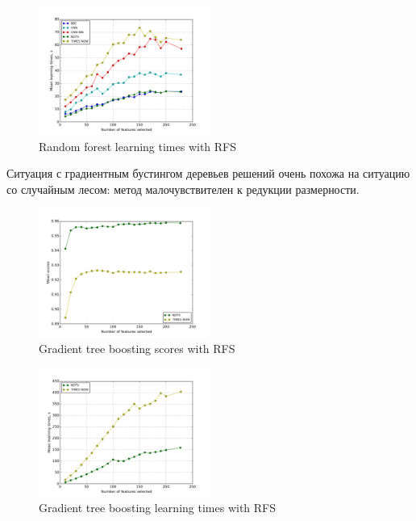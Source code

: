  \begin{figure}[h!]
    \centering
    \includegraphics[width=0.5\textwidth]{images/RFS-randforestTime.png}
    \caption{Random forest learning times with RFS}
    \label{fig:randfor_rfs_times}
\end{figure} 

\par
Ситуация с градиентным бустингом деревьев решений очень похожа на ситуацию со случайным лесом: метод малочувствителен к редукции размерности.

\begin{figure}[h!]
    \centering
    \includegraphics[width=0.5\textwidth]{images/RFS-GTB.png}
    \caption{Gradient tree boosting scores with RFS}
    \label{fig:gtb_rfs_scores}
\end{figure} 
 
 \begin{figure}[h!]
    \centering
    \includegraphics[width=0.5\textwidth]{images/RFS-GTBTime.png}
    \caption{Gradient tree boosting learning times with RFS}
    \label{fig:gtb_rfs_times}
\end{figure}
\par
